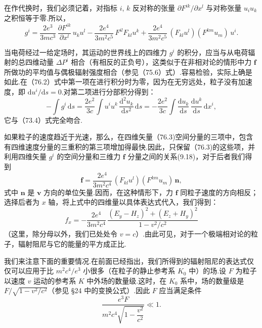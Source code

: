 在作代换时，我们必须记着，对指标 $i$, $k$ 反对称的张量 $\partial F^{ik}/\partial x^l$ 与对称张量 $u_iu_k$ 之积恒等于零.所以，
\begin{equation}
  g^i=\frac{2e^3}{3mc^3}\,\frac{\partial F^{ik}}{\partial x^l}\,u_ku^l
  -\frac{2e^4}{3m^2c^5}\,F^{il}F_{kl}u^k
  +\frac{2e^4}{3m^2c^5}\,(F_{kl}u^l)(F^{km}u_m)\,u^i.
\end{equation}

当电荷经过一给定场时，其运动的世界线上的四维力 $g^i$ 的积分，应当与从电荷辐射的总四维动量 $\Delta P^i$ 相合（有相反的正负号），这类似于在非相对论的情形中力 $\boldsymbol{f}$ 所做功的平均值与偶极辐射强度相合（参见（75.6）式）.容易检验，实际上确是如此.在（76.2）式中第一项在进行积分时为零，因为在无穷远处，粒子没有加速度，即 $\mathrm{d}u^i/\mathrm{d}s=0$.对第二项进行分部积分得到：
\begin{equation*}
  -\int g^i\,\mathrm{d}s=\frac{2e^2}{3c}\int u^iu^k\,\frac{\mathrm{d}^2u_k}{\mathrm{d}s^2}\,\mathrm{d}s
  =-\frac{2e^2}{3c}\int\frac{\mathrm{d}u_k}{\mathrm{d}s}\,\frac{\mathrm{d}u^k}{\mathrm{d}s}\,\mathrm{d}x^i,
\end{equation*}
它与（73.4）式完全吻合.

如果粒子的速度趋近于光速，那么，在四维矢量（76.3)空间分量的三项中，包含有四维速度分量的三重积的第三项增加得最快.因此，只保留（76.3)的这些项，并利用四维矢量 $g^i$ 的空间分量和三维力 $\boldsymbol{f}$ 分量之间的关系(9.18)，对于后者我们得到
\begin{equation*}
  \boldsymbol{f}=\frac{2e^4}{3m^2c^4}\,(F_{kl}u^l)(F^{km}u_m)\,\boldsymbol{n},
\end{equation*}
式中 $\boldsymbol{n}$ 是 $\boldsymbol{v}$ 方向的单位矢量.因而，在这种情形下，力 $\boldsymbol{f}$ 同粒子速度的方向相反；选择后者为 $x$ 轴，将上式中的四维量以具体表达式代入，我们得到：
\begin{equation}
  f_x=-\frac{2e^4}{3m^2c^4}\,
  \frac{(E_y-H_z)^2+(E_z+H_y)^2}{1-v^2/c^2}
\end{equation}
（这里，除分母以外，我们已处处令 $v=c$）.由此可见，对于一个极端相对论的粒子，辐射阻尼与它的能量的平方成正比.

我们来注意下面的重要情况.在前面已经指出，我们所得到的辐射阻尼的表达式仅仅可以应用于比 $m^2c^4/e^3$ 小很多（在粒子的静止参考系 $K_0$ 中）的场.设 $F$ 为粒子以速度 $v$ 运动的参考系 $K$ 中外场的数量级.这时，在 $K_0$ 系中，场的数量级是 $F/\sqrt{1-v^2/c^2}$（参见 §24 中的变换公式）.因此 $F$ 应当满足条件
\begin{equation}
  \frac{e^3F}{m^2c^4\sqrt{1-\dfrac{v^2}{c^2}}}\ll 1.
\end{equation}

